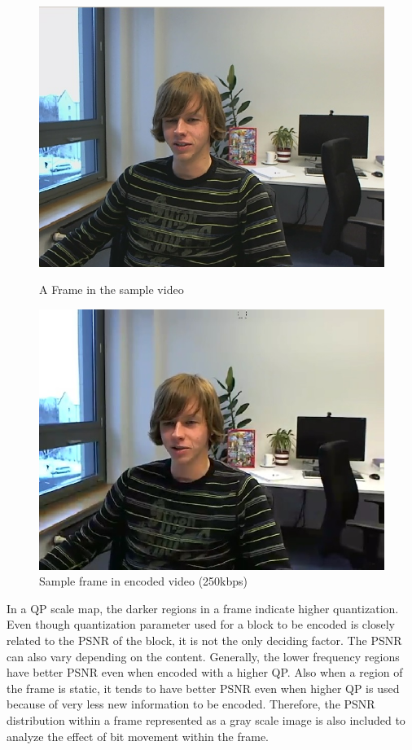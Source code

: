 \documentclass[11pt]{article} %
\begin{document}
\begin{figure}[!h]
    \centering
    \includegraphics[scale=0.5]{PaulDefault120}
    \caption{A Frame in the sample video}
    \label{fig:PaulDefault120}
    \includegraphics[scale=0.5]{PaulDefault120_91250kbps}
    \caption{Sample frame in encoded video (250kbps)}
    \label{fig:PaulDefaultencoded}
\end{figure} 

In a QP scale map, the darker regions in a frame indicate higher quantization. Even though quantization parameter used for a block to be encoded is closely related to the PSNR of the block, it is not the only deciding factor. The PSNR can also vary depending on the content. Generally, the lower frequency regions have better PSNR even when encoded with a higher QP. Also when a region of the frame is static, it tends to have better PSNR even when higher QP is used because of very less new information to be encoded. Therefore, the PSNR distribution within a frame represented as a gray scale image is also included to analyze the effect of bit movement within the frame.
\end{document}
